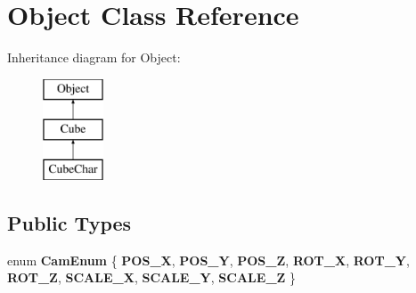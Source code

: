 \hypertarget{class_object}{}\section{Object Class Reference}
\label{class_object}
Inheritance diagram for Object\+:\begin{figure}[H]
\begin{center}
\leavevmode
\includegraphics[height=3.000000cm]{class_object}
\end{center}
\end{figure}
\subsection*{Public Types}
\begin{DoxyCompactItemize}
\item 
\mbox{\label{class_object_a9bb8746e3c466dae7df7f8745e548b41}} 
enum {\bfseries Cam\+Enum} \{ \newline
{\bfseries P\+O\+S\+\_\+X}, 
{\bfseries P\+O\+S\+\_\+Y}, 
{\bfseries P\+O\+S\+\_\+Z}, 
{\bfseries R\+O\+T\+\_\+X}, 
\newline
{\bfseries R\+O\+T\+\_\+Y}, 
{\bfseries R\+O\+T\+\_\+Z}, 
{\bfseries S\+C\+A\+L\+E\+\_\+X}, 
{\bfseries S\+C\+A\+L\+E\+\_\+Y}, 
\newline
{\bfseries S\+C\+A\+L\+E\+\_\+Z}
 \}
\end{DoxyCompactItemize}
